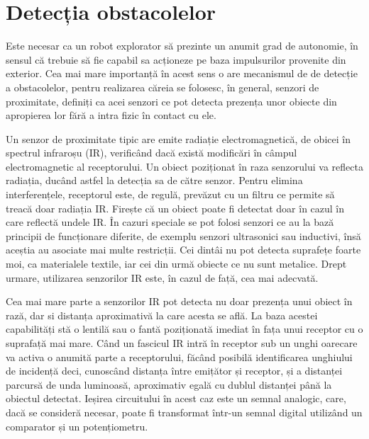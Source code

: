 \section{Detecția obstacolelor}

Este necesar ca un robot explorator să prezinte un anumit grad de autonomie, în sensul că trebuie să fie capabil sa acționeze pe baza impulsurilor provenite din exterior. Cea mai mare importanță în acest sens o are mecanismul de de detecție a obstacolelor, pentru realizarea căreia se folosesc, în general, senzori de proximitate, definiți ca acei senzori ce pot detecta prezența unor obiecte din apropierea lor fără a intra fizic în contact cu ele.

Un senzor de proximitate tipic are emite radiație electromagnetică, de obicei în spectrul infraroșu (IR), verificând dacă există modificări în câmpul electromagnetic al receptorului. Un obiect poziționat în raza senzorului va reflecta radiația, ducând astfel la detecția sa de către senzor. Pentru elimina interferențele, receptorul este, de regulă, prevăzut cu un filtru ce permite să treacă doar radiația IR. Firește că un obiect poate fi detectat doar în cazul în care reflectă undele IR. În cazuri speciale se pot folosi senzori ce au la bază principii de funcționare diferite, de exemplu senzori ultrasonici sau inductivi, însă aceștia au asociate mai multe restricții. Cei dintâi nu pot detecta suprafețe foarte moi, ca materialele textile, iar cei din urmă obiecte ce nu sunt metalice. Drept urmare, utilizarea senzorilor IR este, în cazul de față, cea mai adecvată.


Cea mai mare parte a senzorilor IR pot detecta nu doar prezența unui obiect în rază, dar si distanța aproximativă la care acesta se află. La baza acestei capabilități stă o lentilă sau o fantă poziționată imediat în fața unui receptor cu o suprafață mai mare. Când un fascicul IR intră în receptor sub un unghi oarecare va activa o anumită parte a receptorului, făcând posibilă identificarea unghiului de incidență deci, cunoscând distanța între emițător și receptor, și a distanței parcursă de unda luminoasă, aproximativ egală cu dublul distanței până la obiectul detectat. Ieșirea circuitului în acest caz este un semnal analogic, care, dacă se consideră necesar, poate fi transformat într-un semnal digital utilizând un comparator și un potențiometru.


